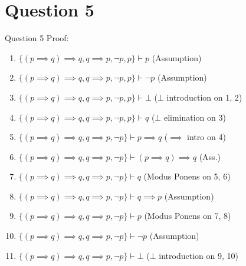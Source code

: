 \documentclass{beamer}
\begin{document}
    \section{Question 5}
    {
        \begin{frame}{Question 5}
            Proof:         
            \begin{enumerate}
                \item $\{(p \implies q) \implies q, q \implies p, \neg p, p\} \vdash p$ (Assumption)
                \item $\{(p \implies q) \implies q, q \implies p, \neg p, p\} \vdash \neg p$ (Assumption)
                \item $\{(p \implies q) \implies q, q \implies p, \neg p, p\} \vdash \bot$ ($\bot$ introduction on 1, 2)
                \item $\{(p \implies q) \implies q, q \implies p, \neg p, p\} \vdash q$ ($\bot$ elimination on 3)
                \item $\{(p \implies q) \implies q, q \implies p, \neg p\} \vdash p \implies q$ ($\implies$ intro on 4)
                \item $\{(p \implies q) \implies q, q \implies p, \neg p\} \vdash (p \implies q) \implies q$ (Ass.)
                \item $\{(p \implies q) \implies q, q \implies p, \neg p\} \vdash q$ (Modus Ponens on 5, 6)
                \item $\{(p \implies q) \implies q, q \implies p, \neg p\} \vdash q \implies p$ (Assumption)
                \item $\{(p \implies q) \implies q, q \implies p, \neg p\} \vdash p$ (Modus Ponens on 7, 8)
                \item $\{(p \implies q) \implies q, q \implies p, \neg p\} \vdash \neg p$ (Assumption)
                \item $\{(p \implies q) \implies q, q \implies p, \neg p\} \vdash \bot$ ($\bot$ introduction on 9, 10)

\end{enumerate}
\end{frame}}
\end{document}
